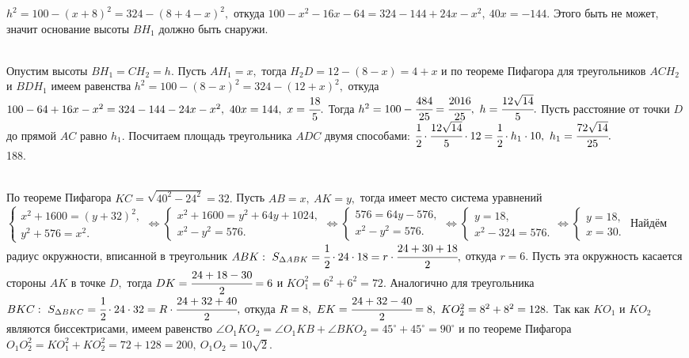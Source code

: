 $h^2=100-(x+8)^2=324-(8+4-x)^2,$ откуда $100-x^2-16x-64=324-144+24x-x^2,\ 40x=-144.$ Этого быть не может, значит основание высоты $BH_1$ должно быть снаружи.\\
 \begin{figure}[ht!]
\end{figure}\\
Опустим высоты $BH_1=CH_2=h.$ Пусть $AH_1=x,$ тогда $H_2D=12-(8-x)=4+x$ и по теореме Пифагора для треугольников $ACH_2$ и $BDH_1$ имеем равенства
$h^2=100-(8-x)^2=324-(12+x)^2,$ откуда $100-64+16x-x^2=324-144-24x-x^2,\ 40x=144,\ x=\cfrac{18}{5}.$ Тогда $h^2=100-\cfrac{484}{25}=\cfrac{2016}{25},\ h=\cfrac{12\sqrt{14}}{5}.$ Пусть расстояние от точки $D$ до прямой $AC$ равно $h_1.$ Посчитаем площадь треугольника $ADC$ двумя способами:
$\cfrac{1}{2}\cdot\cfrac{12\sqrt{14}}{5}\cdot12=
\cfrac{1}{2}\cdot h_1\cdot10,\ h_1=\cfrac{72\sqrt{14}}{25}.$\\
188. \begin{figure}[ht!]
\end{figure}\\
По теореме Пифагора $KC=\sqrt{40^2-24^2}=32.$ Пусть $AB=x,\ AK=y,$ тогда имеет место система уравнений $\begin{cases}x^2+1600=(y+32)^2,\\
y^2+576=x^2.\end{cases}\Leftrightarrow\begin{cases}x^2+1600=y^2+64y+1024,\\
x^2-y^2=576.\end{cases}\Leftrightarrow\begin{cases}576=64y-576,\\
x^2-y^2=576.\end{cases}\Leftrightarrow\begin{cases}y=18,\\
x^2-324=576.\end{cases}\Leftrightarrow\begin{cases}y=18,\\
x=30.\end{cases}$ Найдём радиус окружности, вписанной в треугольник $ABK:\ S_{\Delta ABK}=\cfrac{1}{2}\cdot24\cdot18=r\cdot\cfrac{24+30+18}{2},$ откуда $r=6.$ Пусть эта окружность касается стороны $AK$ в точке $D,$ тогда $DK=\cfrac{24+18-30}{2}=6$ и $KO_1^2=6^2+6^2=72.$ Аналогично для треугольника $BKC:\ S_{\Delta BKC}=\cfrac{1}{2}\cdot24\cdot32=R\cdot\cfrac{24+32+40}{2},$ откуда $R=8,\ EK=\cfrac{24+32-40}{2}=8,\ KO_2^2=8^2+8^2=128.$ Так как $KO_1$ и $KO_2$ являются биссектрисами, имеем равенство $\angle O_1KO_2=\angle O_1KB+\angle BKO_2=45^\circ+45^\circ=90^\circ$ и по теореме Пифагора $O_1O_2^2=KO_1^2+KO_2^2=72+128=200,\ O_1O_2=10\sqrt{2}.$\\
